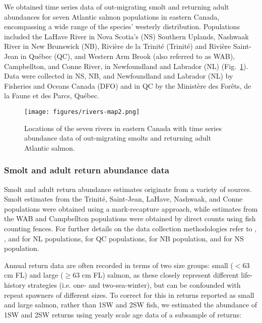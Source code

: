 \documentclass[12pt]{article}
\begin{document}
We obtained time series data of out-migrating smolt and returning adult
abundances for seven Atlantic salmon populations in eastern Canada, encompassing a
wide range of the species' westerly distribution. 
Populations included the LaHave River in Nova Scotia's (NS) Southern Uplands, 
Nashwaak River in New Brunswick (NB), Rivi\`{e}re de la Trinit\'{e} (Trinit\'{e}) and
Rivi\`{e}re Saint-Jean in Qu\'{e}bec (QC), and Western Arm Brook (also referred to as WAB), 
Campbellton, and Conne River, in Newfoundland and Labrador (NL) (Fig.~\ref{fig:map}). 
Data were collected in NS, NB, and Newfoundland
and Labrador (NL) by Fisheries and Oceans Canada (DFO) and in QC
by the Minist\`{e}re des For\^{e}ts, de la Faune et des Parcs, Qu\'{e}bec.

\begin{figure}[htbp] \centering
    \texttt{[image: figures/rivers-map2.png]}
    \caption{Locations of the seven rivers in eastern Canada with time series abundance data of out-migrating smolts and 
    returning adult Atlantic salmon.} \label{fig:map} 
\end{figure}

\subsubsection*{Smolt and adult return abundance data}

Smolt and adult return abundance estimates originate from a variety of
sources. Smolt estimates from the Trinit\'{e}, Saint-Jean, LaHave, Nashwaak,
and Conne populations were obtained using a mark-recapture approach, while
estimates from the WAB and Campbellton populations were obtained by direct
counts using fish counting fences.
For further details on the data collection methodologies refer to 
\citet{Dempson1991}, \citet{Schwarz1994}, and \citet{Venoitt2018} for NL populations, 
\citet{April2018}  for QC populations,
\citet{Jones2014} for NB population,
and \citet{Gibson2009} for NS population. 

Annual return data are often recorded in terms of two size groups: small ($< 63$ cm
FL) and large ($\geq 63$ cm FL) salmon, as these closely represent different
life-history strategies (i.e. one- and two-sea-winter), but can be confounded with repeat
spawners of different sizes. To correct for this in returns 
reported as small and large salmon, rather than 1SW and 2SW fish, we estimated the abundance
of 1SW and 2SW returns using yearly scale age data of a subsample of returns:
\end{document}
